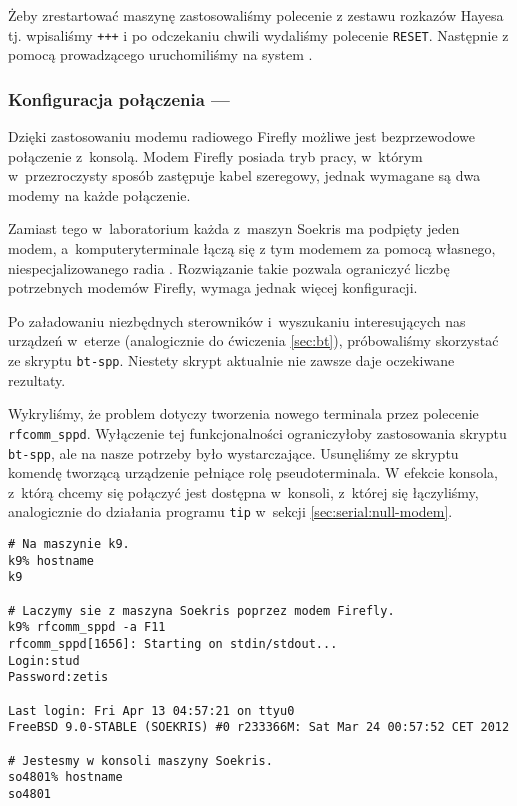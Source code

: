 Żeby zrestartować maszynę \zielone{} zastosowaliśmy polecenie z zestawu rozkazów
Hayesa tj. wpisaliśmy \texttt{+++} i po odczekaniu chwili wydaliśmy polecenie
\texttt{RESET}. Następnie z pomocą prowadzącego uruchomiliśmy na \zielone{}
system \bsd.

\subsubsection{Konfiguracja połączenia --- \bt}

Dzięki zastosowaniu modemu radiowego Firefly możliwe jest bezprzewodowe
połączenie z~konsolą. Modem Firefly posiada tryb pracy, w~którym w~przezroczysty
sposób zastępuje kabel szeregowy, jednak wymagane są dwa modemy na każde
połączenie.

Zamiast tego w~laboratorium każda z~maszyn Soekris ma podpięty jeden modem,
a~komputery\dywiz terminale łączą się z tym modemem za pomocą własnego,
niespecjalizowanego radia \bt. Rozwiązanie takie pozwala ograniczyć liczbę
potrzebnych modemów Firefly, wymaga jednak więcej konfiguracji.

Po załadowaniu niezbędnych sterowników i~wyszukaniu interesujących nas urządzeń
w~eterze (analogicznie do ćwiczenia \ref{sec:bt}), próbowaliśmy skorzystać ze
skryptu \texttt{bt-spp}. Niestety skrypt aktualnie nie zawsze daje oczekiwane
rezultaty.

Wykryliśmy, że problem dotyczy tworzenia nowego terminala przez polecenie
\texttt{rfcomm\_sppd}. Wyłączenie tej funkcjonalności ograniczyłoby zastosowania
skryptu \texttt{bt-spp}, ale na nasze potrzeby było wystarczające. Usunęliśmy ze
skryptu komendę tworzącą urządzenie pełniące rolę pseudo\dywiz terminala. W
efekcie konsola, z~którą chcemy się połączyć jest dostępna w~konsoli, z~której
się łączyliśmy, analogicznie do działania programu \texttt{tip} w~sekcji
\ref{sec:serial:null-modem}.

\begin{lstlisting}[caption={Połączenie z konsolą maszyny Soekris za pomocą programu \texttt{rfcomm\_sppd}.}]
# Na maszynie k9.
k9% hostname
k9

# Laczymy sie z maszyna Soekris poprzez modem Firefly.
k9% rfcomm_sppd -a F11
rfcomm_sppd[1656]: Starting on stdin/stdout...
Login:stud
Password:zetis

Last login: Fri Apr 13 04:57:21 on ttyu0
FreeBSD 9.0-STABLE (SOEKRIS) #0 r233366M: Sat Mar 24 00:57:52 CET 2012

# Jestesmy w konsoli maszyny Soekris.
so4801% hostname
so4801
\end{lstlisting}
